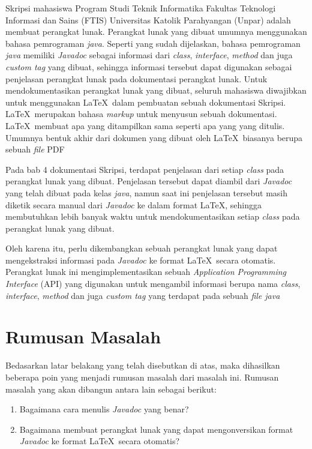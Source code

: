 \documentclass[a4paper,twoside]{article}
\begin{document}
Skripsi mahasiswa Program Studi Teknik Informatika Fakultas Teknologi Informasi dan Sains (FTIS) Universitas Katolik Parahyangan (Unpar) adalah membuat perangkat lunak. Perangkat lunak yang dibuat umumnya menggunakan bahasa pemrograman {\it java}. Seperti yang sudah dijelaskan, bahasa pemrograman {\it java} memiliki {\it Javadoc} sebagai informasi dari {\it class}, {\it interface}, {\it method} dan juga {\it custom tag} yang dibuat, sehingga informasi tersebut dapat digunakan sebagai penjelasan perangkat lunak pada dokumentasi perangkat lunak. Untuk mendokumentasikan perangkat lunak yang dibuat, seluruh mahasiswa diwajibkan untuk menggunakan \LaTeX\ dalam pembuatan sebuah dokumentasi Skripsi. \LaTeX\ merupakan bahasa {\it markup} untuk menyusun sebuah dokumentasi. \LaTeX\ membuat apa yang ditampilkan sama seperti apa yang yang ditulis. Umumnya bentuk akhir dari dokumen yang dibuat oleh \LaTeX\ biasanya berupa sebuah {\it file} PDF

Pada bab 4 dokumentasi Skripsi, terdapat penjelasan dari setiap {\it class} pada perangkat lunak yang dibuat. Penjelasan tersebut dapat diambil dari {\it Javadoc} yang telah dibuat pada kelas {\it java}, namun saat ini penjelasan tersebut masih diketik secara manual dari {\it Javadoc} ke dalam format \LaTeX, sehingga membutuhkan lebih banyak waktu untuk mendokumentasikan setiap {\it class} pada perangkat lunak yang dibuat.

Oleh karena itu, perlu dikembangkan sebuah perangkat lunak yang dapat mengekstraksi informasi pada {\it Javadoc} ke format \LaTeX\ secara otomatis. Perangkat lunak ini mengimplementasikan sebuah {\it Application Programming Interface} (API) yang digunakan untuk mengambil informasi berupa nama {\it class}, {\it interface}, {\it method} dan juga {\it custom tag} yang terdapat pada sebuah {\it file java}

\section{Rumusan Masalah}
Bedasarkan latar belakang yang telah disebutkan di atas, maka dihasilkan beberapa poin yang menjadi rumusan masalah dari masalah ini. Rumusan masalah yang akan dibangun antara lain sebagai berikut:
\begin{enumerate}
	\item Bagaimana cara menulis {\it Javadoc} yang benar?
	\item Bagaimana membuat perangkat lunak yang dapat mengonversikan format {\it Javadoc} ke format \LaTeX\ secara otomatis?
\end{enumerate}
\end{document}
